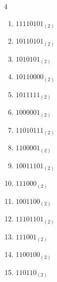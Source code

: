 \begin{multicols}{4}
\begin{enumerate}
        \phantom{$=203$}

  \item $11110101_{(2)}$

        \phantom{$=245$}

\columnbreak %

  \item $10110101_{(2)}$

        \phantom{$=181$}

  \item $1010101_{(2)}$

        \phantom{$=85$}

  \item $10110000_{(2)}$

        \phantom{$=176$}

  \item $1011111_{(2)}$

        \phantom{$=95$}

  \item $1000001_{(2)}$

        \phantom{$=65$}

  \item $11010111_{(2)}$

        \phantom{$=215$}

  \item $1100001_{(2)}$

        \phantom{$=97$}

  \item $10011101_{(2)}$

        \phantom{$=157$}

  \item $111000_{(2)}$

        \phantom{$=56$}

  \item $1001100_{(2)}$

        \phantom{$=76$}

  \item $11101101_{(2)}$

        \phantom{$=237$}

  \item $111001_{(2)}$

        \phantom{$=57$}

  \item $1100100_{(2)}$

        \phantom{$=100$}

  \item $110110_{(2)}$


\end{enumerate}
\end{multicols}
